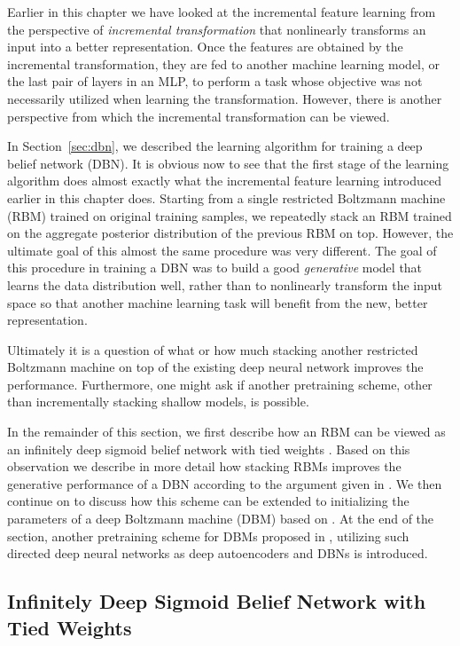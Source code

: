 \documentclass[dissertation,nocontribution,draft*]{aaltoseries}
\begin{document}
Earlier in this chapter we have looked at the incremental
feature learning from the perspective of \textit{incremental
transformation} that nonlinearly transforms an input into a
better representation. Once the features are obtained by
the incremental transformation, they are fed to another
machine learning model, or the last pair of layers in an
MLP, to perform a task whose objective was not necessarily
utilized when learning the transformation. However, there is
another perspective from which the incremental
transformation can be viewed.

In Section~\ref{sec:dbn}, we described the learning
algorithm for training a deep belief network (DBN). It is
obvious now to see that the first stage of the learning
algorithm does almost exactly what the incremental feature
learning introduced earlier in this chapter does. Starting
from a single restricted Boltzmann machine (RBM) trained on
original training samples, we repeatedly stack an RBM
trained on the aggregate posterior distribution of the
previous RBM on top.  However, the ultimate goal of this
almost the same procedure was very different.
The goal of this procedure in training a DBN was to build a
good \textit{generative} model that learns the data
distribution well, rather than to nonlinearly transform the
input space so that another machine learning task will
benefit from the new, better representation.

Ultimately it is a question of what or how much
stacking another restricted Boltzmann machine on top of the
existing deep neural network improves the performance.
Furthermore, one might ask if another pretraining scheme,
other than incrementally stacking shallow models, is
possible.

In the remainder of this section, we first describe how an
RBM can be viewed as an infinitely deep sigmoid belief
network with tied weights \citep{Hinton2006nc}. Based on
this observation we describe in more detail how stacking
RBMs improves the generative performance of a DBN according
to the argument given in
\citep{Hinton2006nc,Salakhutdinov2012nc}.  We then continue
on to discuss how this scheme can be extended to
initializing the parameters of a deep Boltzmann machine
(DBM) based on
\citep{Salakhutdinov2012nc,Salakhutdinov2012}. At the end of
the section, another pretraining scheme for DBMs proposed in
, utilizing such directed deep neural
networks as deep autoencoders and DBNs is introduced.


\subsection{Infinitely Deep Sigmoid Belief Network with
Tied Weights}
\label{sec:inf_sbn_rbm}
\end{document}
